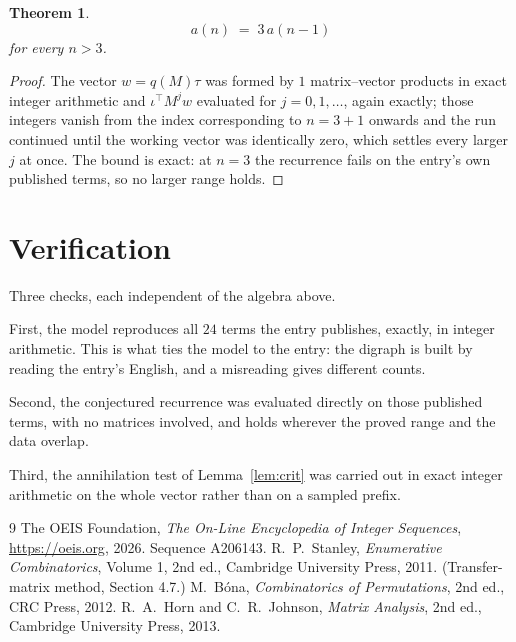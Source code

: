 \documentclass[11pt,a4paper]{article}
\theoremstyle{plain}
\newtheorem{theorem}{Theorem}
\theoremstyle{definition}
\begin{document}
\begin{theorem}
\[
a(n)\;=\;3\,a(n-1)
\]
for every $n>3$.
\end{theorem}

\begin{proof}
The vector $w=q(M)\tau$ was formed by $1$ matrix--vector products in exact integer
arithmetic and $\iota^{\!\top}M^{j}w$ evaluated for $j=0,1,\dots$, again exactly; those
integers vanish from the index corresponding to $n=3+1$ onwards and the run continued
until the working vector was identically zero, which settles every larger $j$ at once. The bound is exact: at $n=3$ the recurrence fails on the entry's own published terms, so no larger range holds.
\end{proof}

\section{Verification}

Three checks, each independent of the algebra above.

First, the model reproduces all $24$ terms the entry publishes, exactly, in integer
arithmetic. This is what ties the model to the entry: the digraph is built by reading the
entry's English, and a misreading gives different counts.

Second, the conjectured recurrence was evaluated directly on those published terms, with no
matrices involved, and holds wherever the proved range and the data overlap.

Third, the annihilation test of Lemma~\ref{lem:crit} was carried out in exact integer
arithmetic on the whole vector rather than on a sampled prefix.

\begin{thebibliography}{9}
 The OEIS Foundation, \emph{The On-Line Encyclopedia of Integer
Sequences}, \url{https://oeis.org}, 2026. Sequence A206143.
 R.~P.~Stanley, \emph{Enumerative Combinatorics}, Volume 1, 2nd ed.,
Cambridge University Press, 2011. (Transfer-matrix method, Section 4.7.)
 M.~B\'ona, \emph{Combinatorics of Permutations}, 2nd ed., CRC
Press, 2012.
 R.~A.~Horn and C.~R.~Johnson, \emph{Matrix Analysis}, 2nd ed., Cambridge
University Press, 2013.
\end{thebibliography}
\end{document}
